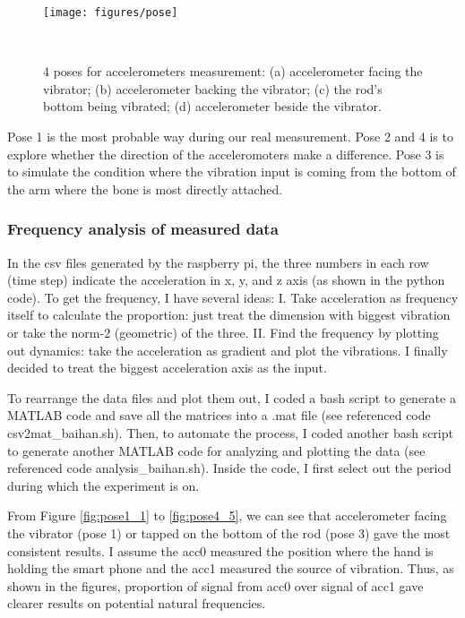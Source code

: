 \documentclass{sigchi}
\begin{document}
\begin{figure*}
  \centering
  \texttt{[image: figures/pose]}
  \caption{4 poses for accelerometers measurement: (a) accelerometer facing the vibrator; (b) accelerometer backing the vibrator; (c) the rod's bottom being vibrated; (d) accelerometer beside the vibrator.}
    ~\label{fig:pose}
\end{figure*}

Pose 1 is the most probable way during our real measurement. Pose 2 and 4 is to explore whether the direction of the acceleromoters make a difference. Pose 3 is to simulate the condition where the vibration input is coming from the bottom of the arm where the bone is most directly attached.

\subsubsection{Frequency analysis of measured data} 

In the csv files generated by the raspberry pi, the three numbers in each row (time step) indicate the acceleration in x, y, and z axis (as shown in the python code). To get the frequency, I have several ideas: I. Take acceleration as frequency itself to calculate the proportion: just treat the dimension with biggest vibration or take the norm-2 (geometric) of the three. II. Find the frequency by plotting out dynamics: take the acceleration as gradient and plot the vibrations. I finally decided to treat the biggest acceleration axis as the input. 

To rearrange the data files and plot them out, I coded a bash script to generate a MATLAB code and save all the matrices into a .mat file (see referenced code csv2mat\_baihan.sh). Then, to automate the process, I coded another bash script to generate another MATLAB code for analyzing and plotting the data (see referenced code analysis\_baihan.sh). Inside the code, I first select out the period during which the experiment is on.

From Figure \ref{fig:pose1_1} to \ref{fig:pose4_5}, we can see that accelerometer facing the vibrator (pose 1) or tapped on the bottom of the rod (pose 3) gave the most consistent results. I assume the acc0 measured the position where the hand is holding the smart phone and the acc1 measured the source of vibration. Thus, as shown in the figures, proportion of signal from acc0 over signal of acc1 gave clearer results on potential natural frequencies.
\end{document}
